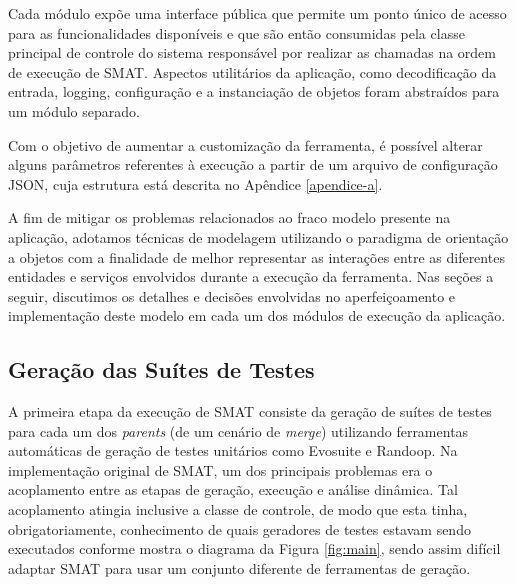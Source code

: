 \documentclass[12pt]{article}
\begin{document}
Cada módulo expõe uma interface pública que permite um ponto único de acesso para as funcionalidades disponíveis e que são então consumidas pela classe principal de controle do sistema responsável por realizar as chamadas na ordem de execução de SMAT. Aspectos utilitários da aplicação, como decodificação da entrada, logging, configuração e a instanciação de objetos foram abstraídos para um módulo separado.

Com o objetivo de aumentar a customização da ferramenta, é possível alterar alguns parâmetros referentes à execução a partir de um arquivo de configuração JSON, cuja estrutura está descrita no Apêndice \ref{apendice-a}.

A fim de mitigar os problemas relacionados ao fraco modelo presente na aplicação, adotamos técnicas de modelagem utilizando o paradigma de orientação a objetos com a finalidade de melhor representar as interações entre as diferentes entidades e serviços envolvidos durante a execução da ferramenta. Nas seções a seguir, discutimos os detalhes e decisões envolvidas no aperfeiçoamento e implementação deste modelo em cada um dos módulos de execução da aplicação.

\subsection{Geração das Suítes de Testes}
A primeira etapa da execução de SMAT consiste da geração de suítes de testes para cada um dos \textit{parents} (de um cenário de \textit{merge}) utilizando ferramentas automáticas de geração de testes unitários como Evosuite e Randoop. Na implementação original de SMAT, um dos principais problemas era o acoplamento entre as etapas de geração, execução e análise dinâmica. Tal acoplamento atingia inclusive a classe de controle, de modo que esta tinha, obrigatoriamente, conhecimento de quais geradores de testes estavam sendo executados conforme mostra o diagrama da Figura \ref{fig:main}, sendo assim difícil adaptar SMAT para usar um conjunto diferente de ferramentas de geração.
\end{document}
